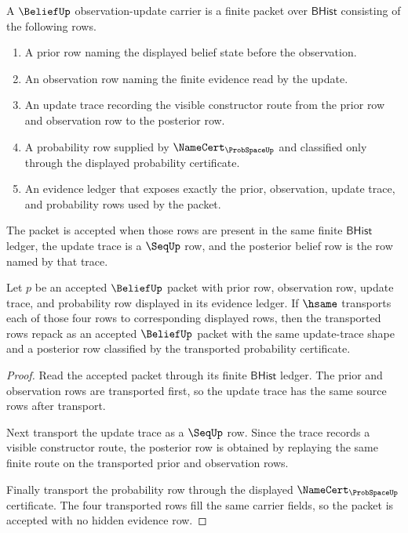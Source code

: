 \begin{definition}
\label{def:belief-observation-update-carrier}
A $\BeliefUp$ observation-update carrier is a finite packet over
$\mathsf{BHist}$ consisting of the following rows.
\begin{enumerate}
\item A prior row naming the displayed belief state before the observation.
\item An observation row naming the finite evidence read by the update.
\item An update trace recording the visible constructor route from the prior
row and observation row to the posterior row.
\item A probability row supplied by $\NameCert_{\ProbSpaceUp}$ and classified
only through the displayed probability certificate.
\item An evidence ledger that exposes exactly the prior, observation, update
trace, and probability rows used by the packet.
\end{enumerate}
The packet is accepted when those rows are present in the same finite
$\mathsf{BHist}$ ledger, the update trace is a $\SeqUp$ row, and the posterior
belief row is the row named by that trace.
\end{definition}

\begin{theorem}
\label{thm:belief-classifier-transport-obligation}
Let $p$ be an accepted $\BeliefUp$ packet with prior row, observation row,
update trace, and probability row displayed in its evidence ledger. If
$\hsame$ transports each of those four rows to corresponding displayed rows,
then the transported rows repack as an accepted $\BeliefUp$ packet with the
same update-trace shape and a posterior row classified by the transported
probability certificate.
\end{theorem}
\begin{proof}
Read the accepted packet through its finite $\mathsf{BHist}$ ledger. The prior
and observation rows are transported first, so the update trace has the same
source rows after transport.

Next transport the update trace as a $\SeqUp$ row. Since the trace records a
visible constructor route, the posterior row is obtained by replaying the same
finite route on the transported prior and observation rows.

Finally transport the probability row through the displayed
$\NameCert_{\ProbSpaceUp}$ certificate. The four transported rows fill the same
carrier fields, so the packet is accepted with no hidden evidence row.
\end{proof}

